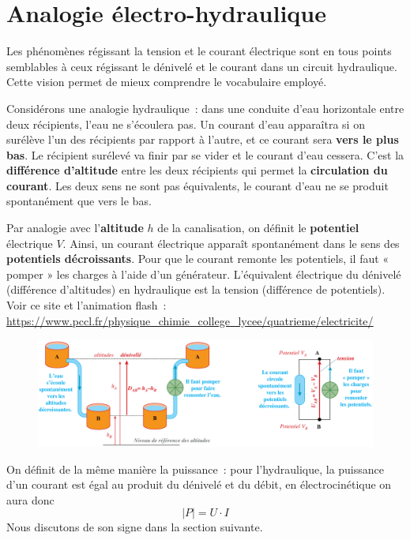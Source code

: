 \documentclass[../../main/main.tex]{subfiles}
\begin{document}
\section{Analogie électro-hydraulique}

Les phénomènes régissant la tension et le courant électrique sont en tous points
semblables à ceux régissant le dénivelé et le courant dans un circuit
hydraulique. Cette vision permet de mieux comprendre le vocabulaire employé.

Considérons une analogie hydraulique~: dans une conduite d'eau horizontale entre
deux récipients, l'eau ne s'écoulera pas. Un courant d'eau apparaîtra si on
surélève l'un des récipients par rapport à l'autre, et ce courant sera
\textbf{vers le plus bas}. Le récipient surélevé va finir par se vider et le
courant d'eau cessera. C'est la \textbf{différence d'altitude} entre les deux
récipients qui permet la \textbf{circulation du courant}. Les deux sens ne sont
pas équivalents, le courant d'eau ne se produit spontanément que vers le bas.

Par analogie avec l'\textbf{altitude} $h$ de la canalisation, on définit le
\textbf{potentiel} électrique $V$. Ainsi, un courant électrique apparaît
spontanément dans le sens des \textbf{potentiels décroissants}. Pour que le
courant remonte les potentiels, il faut « pomper » les charges à l'aide d'un
générateur. L'équivalent électrique du dénivelé (différence d'altitudes) en
hydraulique est la tension (différence de potentiels). Voir ce site et
l'animation flash~: \href{https://www.pccl.fr/physique\_chimie\_college\_lycee/quatrieme/electricite/analogie\_hydraulique.htm}
{https://www.pccl.fr/physique\_chimie\_college\_lycee/quatrieme/electricite/}

\begin{figure}[h]
	\centering
	\includegraphics[width=\linewidth]{anal_elec-hydro.png}
	\label{fig:anal_elec-hydro}
\end{figure}

On définit de la même manière la puissance~: pour l'hydraulique, la puissance
d'un courant est égal au produit du dénivelé et du débit, en
électrocinétique on aura donc
\[\boxed{\left| P \right| = U\cdot I}\]
Nous discutons de son signe dans la section suivante.
\end{document}
